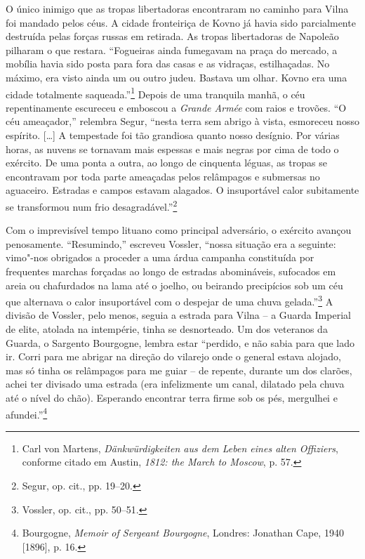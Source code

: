 O único inimigo que as tropas libertadoras encontraram no caminho para
Vilna foi mandado pelos céus. A cidade fronteiriça de Kovno já havia
sido parcialmente destruída pelas forças russas em retirada. As tropas
libertadoras de Napoleão pilharam o que restara. ``Fogueiras ainda
fumegavam na praça do mercado, a mobília havia sido posta para fora das
casas e as vidraças, estilhaçadas. No máximo, era visto ainda um ou
outro judeu. Bastava um olhar. Kovno era uma cidade totalmente
saqueada.''\footnote{Carl von Martens, \textit{Dänkwürdigkeiten aus dem Leben eines alten Offiziers}, conforme citado em Austin, \textit{1812: the March to Moscow}, p. 57.} Depois de uma tranquila manhã, o céu repentinamente escureceu e emboscou a \textit{Grande Armée} com raios e
trovões. ``O céu ameaçador,'' relembra Segur, ``nesta terra sem abrigo à
vista, esmoreceu nosso espírito. [\ldots{}] A tempestade foi tão grandiosa
quanto nosso desígnio. Por várias horas, as nuvens se tornavam mais
espessas e mais negras por cima de todo o exército. De uma ponta a
outra, ao longo de cinquenta léguas, as tropas se encontravam por toda
parte ameaçadas pelos relâmpagos e submersas no aguaceiro. Estradas e
campos estavam alagados. O insuportável calor subitamente se transformou
num frio desagradável.''\footnote{Segur, op. cit., pp. 19--20.}

Com o imprevisível tempo lituano como principal adversário, o exército
avançou penosamente. ``Resumindo,'' escreveu Vossler, ``nossa situação
era a seguinte: vimo"-nos obrigados a proceder a uma árdua campanha
constituída por frequentes marchas forçadas ao longo de estradas
abomináveis, sufocados em areia ou chafurdados na lama até o joelho, ou
beirando precipícios sob um céu que alternava o calor insuportável com o
despejar de uma chuva gelada.''\footnote{Vossler, op. cit., pp. 50--51.}
A divisão de Vossler, pelo menos, seguia a estrada para Vilna -- a Guarda
Imperial de elite, atolada na intempérie, tinha se desnorteado. Um dos
veteranos da Guarda, o Sargento Bourgogne, lembra estar ``perdido, e 
não sabia para que lado ir. Corri para me abrigar na direção do
vilarejo onde o general estava alojado, mas só tinha os relâmpagos para
me guiar -- de repente, durante um dos clarões, achei ter divisado uma
estrada (era infelizmente um canal, dilatado pela chuva até o nível do
chão). Esperando encontrar terra firme sob os pés, mergulhei e
afundei.''\footnote{Bourgogne, \textit{Memoir of Sergeant Bourgogne}, Londres: Jonathan Cape, 1940 {[}1896{]}, p. 16.}

